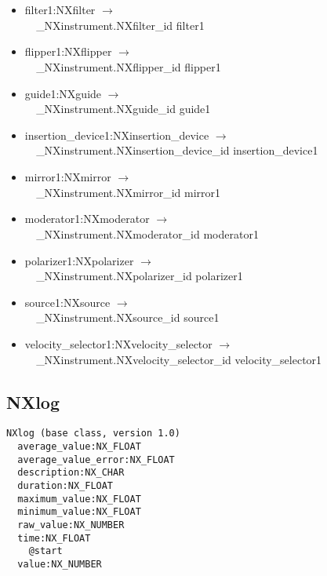 \documentclass[11pt]{article}
\begin{document}
{{\begin{itemize}
\item{filter1:NXfilter $\rightarrow$\\
\verb|  |\_NXinstrument.NXfilter\_id filter1}

\item{flipper1:NXflipper $\rightarrow$\\
\verb|  |\_NXinstrument.NXflipper\_id flipper1}

\item{guide1:NXguide $\rightarrow$\\
\verb|  |\_NXinstrument.NXguide\_id guide1}

\item{insertion\_device1:NXinsertion\_device $\rightarrow$\\
\verb|  |\_NXinstrument.NXinsertion\_device\_id insertion\_device1}

\item{mirror1:NXmirror $\rightarrow$\\
\verb|  |\_NXinstrument.NXmirror\_id mirror1}

\item{moderator1:NXmoderator $\rightarrow$\\
\verb|  |\_NXinstrument.NXmoderator\_id moderator1}

\item{polarizer1:NXpolarizer $\rightarrow$\\
\verb|  |\_NXinstrument.NXpolarizer\_id polarizer1}

\item{source1:NXsource $\rightarrow$\\
\verb|  |\_NXinstrument.NXsource\_id source1}

\item{velocity\_selector1:NXvelocity\_selector $\rightarrow$\\
\verb|  |\_NXinstrument.NXvelocity\_selector\_id velocity\_selector1}
\end{itemize}
\subsection{NXlog}

\begin{verbatim}
NXlog (base class, version 1.0)
  average_value:NX_FLOAT
  average_value_error:NX_FLOAT
  description:NX_CHAR
  duration:NX_FLOAT
  maximum_value:NX_FLOAT
  minimum_value:NX_FLOAT
  raw_value:NX_NUMBER
  time:NX_FLOAT
    @start
  value:NX_NUMBER
\end{verbatim}

}}
\end{document}
